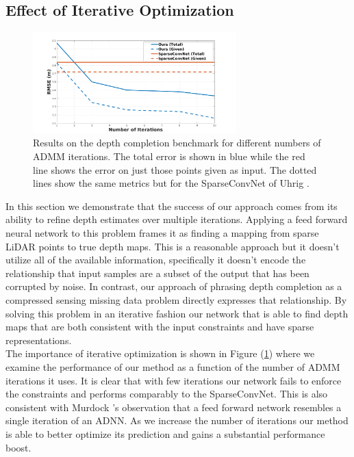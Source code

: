 \subsection{Effect of Iterative Optimization}
\label{sec:effect-iter-optim}
\begin{figure}
  \centering
  \includegraphics[width=0.7\textwidth]{iter_plot}
  \caption{Results on the depth completion benchmark for different numbers of ADMM iterations. The total error is shown in blue while the red line shows the error on just those points given as input. The dotted lines show the same metrics but for the SparseConvNet of Uhrig \etal.}
  \label{fig:iterplot}
\end{figure}

In this section we demonstrate that the success of our approach comes from its ability to refine depth estimates over multiple iterations. Applying a feed forward neural network to this problem frames it as finding a mapping from sparse LiDAR points to true depth maps. This is a reasonable approach but it doesn't utilize all of the available information, specifically it doesn't encode the relationship that input samples are a subset of the output that has been corrupted by noise. In contrast, our approach of phrasing depth completion as a compressed sensing missing data problem directly expresses that relationship. By solving this problem in an iterative fashion our network that is able to find depth maps that are both consistent with the input constraints and have sparse representations.\\

The importance of iterative optimization is shown in Figure (\ref{fig:iterplot}) where we examine the performance of our method as a function of the number of ADMM iterations it uses. It is clear that with few iterations our network fails to enforce the constraints and performs comparably to the SparseConvNet.
This is also consistent with Murdock \etal's observation that a feed forward network resembles a single iteration of an ADNN. As we increase the number of iterations our method is able to better optimize its prediction and gains a substantial performance boost.



